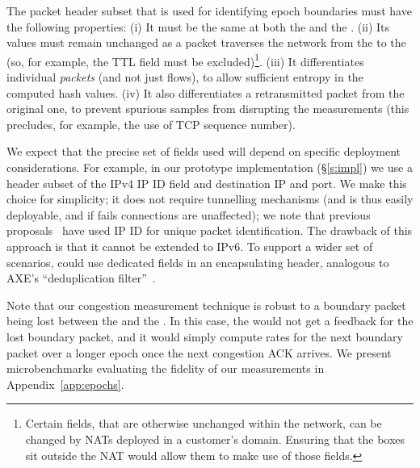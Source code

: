 The packet header subset that is used for identifying epoch boundaries must have the following properties:
(i) It must be the same at both the \inbox and the \outbox.
(ii) Its values must remain unchanged as a packet traverses the network from the \inbox to the \outbox (so, for example, the TTL field must be excluded)\footnote{Certain fields, that are otherwise unchanged within the network, can be changed by NATs deployed in a customer's domain. Ensuring that the \name boxes sit outside the NAT would allow them to make use of those fields.}.
(iii) It differentiates individual \emph{packets} (and not just flows), to allow sufficient entropy in the computed hash values.
(iv) It also differentiates a retransmitted packet from the original one, to prevent spurious samples from disrupting the measurements (this precludes, for example, the use of TCP sequence number).

We expect that the precise set of fields used will depend on specific deployment considerations.
For example, in our prototype implementation (\S\ref{s:impl}) we use a header subset of the IPv4 IP ID field and destination IP and port. 
We make this choice for simplicity; it does not require tunnelling mechanisms (and is thus easily deployable, and if \name fails connections are unaffected); we note that previous proposals~\cite{ip-traceback} have used IP ID for unique packet identification. 
The drawback of this approach is that it cannot be extended to IPv6.
To support a wider set of scenarios, \name could use dedicated fields in an encapsulating header, analogous to AXE's ``deduplication filter''~\cite{axe}.

Note that our congestion measurement technique is robust to a boundary packet being lost between the \inbox and the \outbox. In this case, the \inbox would not get a feedback for the lost boundary packet, and it would simply compute rates for the next boundary packet over a longer epoch once the next congestion ACK arrives. We present microbenchmarks evaluating the fidelity of our measurements in Appendix~\ref{app:epochs}.



